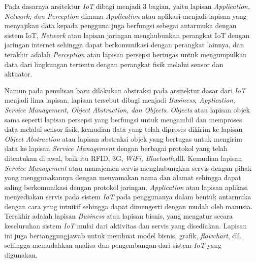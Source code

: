 Pada dasarnya arsitektur \textit{IoT} dibagi menjadi 3 bagian, yaitu lapisan \textit{Application, Network, dan Perception} dimana \textit{Application} atau aplikasi menjadi lapisan yang menyajikan data kepada pengguna juga berfungsi sebegai antarmuka dengan sistem IoT, \textit{Network} atau lapisan jaringan menghubunkan perangkat IoT dengan jaringan internet sehingga dapat berkomunikasi dengan perangkat lainnya, dan terakhir adalah \textit{Perception} atau lapisan persepsi bertugas untuk mengumpulkan data dari lingkungan tertentu dengan perangkat fisik melalui sensor dan aktuator.

Namun pada penulisan baru dilakukan abstraksi pada arsitektur dasar dari \textit{IoT} menjadi lima lapisan, lapisan tersebut dibagi menjadi \textit{Business, Application, Service Management, Object Abstraction, dan Objects}. \textit{Objects} atau lapisan objek sama seperti lapisan persepsi yang berfungsi untuk mengambil dan memproses data melalui sensor fisik, kemudian data yang telah diproses dikirim ke lapisan \textit{Object Abstraction} atau lapisan abstraksi objek yang bertugas untuk mengirim data ke lapisan \textit{Service Management} dengan berbagai protokol yang telah ditentukan di awal, baik itu RFID, 3G, \textit{WiFi, Bluetooth},dll. Kemudian lapisan \textit{Service Management} atau manajemen servis menghubungkan servis dengan pihak yang menggunakannya dengan menyamakan nama dan alamat sehingga dapat saling berkomunikasi dengan protokol jaringan. \textit{Application} atau lapisan aplikasi menyediakan servis pada sistem \textit{IoT} pada penggunanya dalam bentuk antarmuka dengan cara yang intuitif sehingga dapat dimengerti dengan mudah oleh manusia. Terakhir adalah lapisan \textit{Business} atau lapisan bisnis, yang mengatur secara keseluruhan sistem \textit{IoT} mulai dari aktivitas dan servis yang disediakan. Lapisan ini juga bertanggungjawab untuk membuat model bisnis, grafik, \textit{flowchart}, dll. sehingga memudahkan analisa dan pengembangan dari sistem \textit{IoT} yang digunakan. \parencite{iot-arab}



